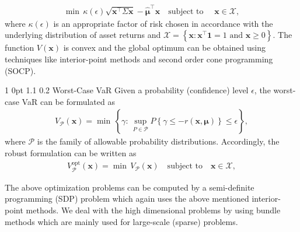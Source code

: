 \documentclass[12pt]{article}
\makeatletter
\numberwithin{equation}{section}
\renewcommand{\subsection}{
  \@startsection
  {subsection}%
  {1}%
  {0pt}%
  {1.1\baselineskip}%
  {0.2\baselineskip}%
  {\sc \centering}%
}
\makeatother
\begin{document}
\begin{equation}
\begin{split}
\min \, \kappa(\epsilon)\sqrt{\mathbf{x}^{\top}\Sigma \mathbf{x}} - \hat{\boldsymbol{\mu}}^{\top}\mathbf{x} \quad \text{subject to } \quad \mathbf{x} \in \mathcal{X},
\end{split}
\label{fig:var_general}
\end{equation}
where $\kappa(\epsilon)$ is an appropriate factor of risk chosen in accordance with the underlying distribution of asset returns and $\mathcal{X} = \left\{ \mathbf{x} : \mathbf{x}^{\top}\mathbf{1} = 1 \text{ and } \mathbf{x} \geq 0 \right\}$. The function $V(\mathbf{x})$ is convex and the global optimum can be obtained using techniques like interior-point methods and second order cone programming (SOCP).

\subsection{Worst-Case VaR}
Given a probability (confidence) level $\epsilon$, the worst-case VaR can be formulated as 
\begin{equation}
\begin{split}
V_{\mathcal{P}}(\mathbf{x}) = \min \, \left\{\gamma : \, \sup_{P \in \mathcal{P}} P\left\{\gamma \leq -r(\mathbf{x},\boldsymbol{\mu})\right\} \leq \epsilon \right\},
\end{split}
\label{fig:wc_var_basic}
\end{equation}
where $\mathcal{P}$ is the family of allowable probability distributions. Accordingly, the robust formulation can be written as 
\begin{equation}
\begin{split}
V_{\mathcal{P}}^{\text{opt}}(\mathbf{x}) = \min \, V_{\mathcal{P}}(\mathbf{x}) \quad \text{subject to} \quad \mathbf{x} \in \mathcal{X}, 
\end{split}
\label{fig:wc_var_general}
\end{equation}

The above optimization problems can be computed by a semi-definite programming (SDP) problem which again uses the above mentioned interior-point methods. We deal with the high dimensional problems by using bundle methods which are mainly used for large-scale (sparse) problems.
\end{document}
